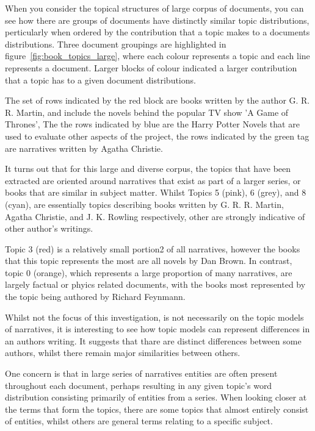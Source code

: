 \documentclass[10pt]{report}
\begin{document}
\begin{multicols}{2}
  \columnbreak
  
  When you consider the topical structures of large corpus of documents, you can see how there are  groups of documents have distinctly similar topic distributions, perticularly when ordered by the contribution that a topic makes to a documents distributions. Three document groupings are highlighted in figure~\ref{fig:book_topics_large}, where each colour represents a topic and each line represents a document. Larger blocks of colour indicated a larger contribution that a topic has to a given document distributions.

  The set of rows indicated by the red block are books written by the author G. R. R. Martin, and include the novels behind the popular TV show 'A Game of Thrones', The the rows indicated by blue are the Harry Potter Novels that are used to evaluate other aspects of the project, the rows indicated by the green tag are narratives written by Agatha Christie.

It turns out that for this large and diverse corpus, the topics that have been extracted are oriented around narratives that exist as part of a larger series, or books that are similar in subject matter. Whilst Topics 5 (pink), 6 (grey), and 8 (cyan), are essentially topics describing books written by G. R. R. Martin, Agatha Christie, and J. K. Rowling respectively, other are strongly indicative of other author's writings.
\end{multicols}

Topic 3 (red) is a relatively small portion2 of all narratives, however the books that this topic represents the most are all novels by Dan Brown. In contrast, topic 0 (orange), which represents a large proportion of many narratives, are largely factual or phyics related documents, with the books most represented by the topic being authored by Richard Feynmann.

Whilst not the focus of this investigation, is not necessarily on the topic models of narratives, it is interesting to see how topic models can represent differences in an authors writing. It suggests that thare are distinct differences between some authors, whilst there remain major similarities between others.

One concern is that in large series of narratives entities are often present throughout each document, perhaps resulting in any given topic's word distribution consisting primarily of entities from a series. When looking closer at the terms that form the topics, there are some topics that almost entirely consist of entities, whilst others are general terms relating to a specific subject.
\end{document}
